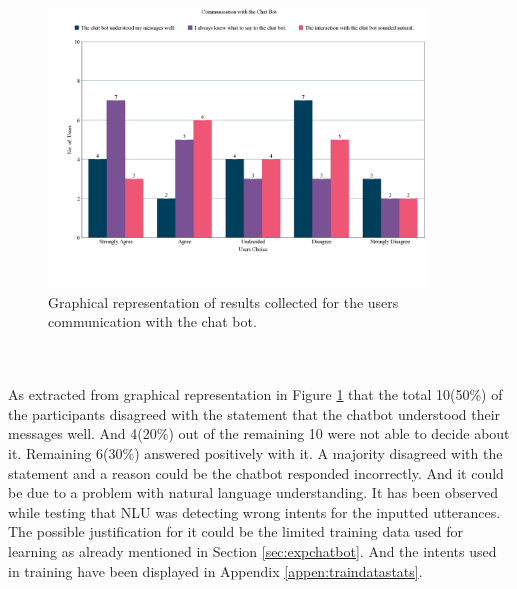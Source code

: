 \begin{figure}[!h]
    \centering
    \includegraphics[width=0.9\textwidth]{img/Communication_with_the_Chat_Bot_Updated.png}
    \caption{Graphical representation of results collected for the users communication with the chat bot.}
    \label{fig:communwithBot}
\end{figure}
\\~\\
As extracted from graphical representation in Figure \ref{fig:communwithBot} that the total 10(50\%) of the participants disagreed with the statement that the chatbot understood their messages well. And 4(20\%) out of the remaining 10 were not able to decide about it. Remaining 6(30\%) answered positively with it. A majority disagreed with the statement and a reason could be the chatbot responded incorrectly. And it could be due to a problem with natural language understanding. It has been observed while testing that NLU was detecting wrong intents for the inputted utterances. The possible justification for it could be the limited training data used for learning as already mentioned in Section \ref{sec:expchatbot}. And the intents used in training have been displayed in Appendix \ref{appen:traindatastats}.

